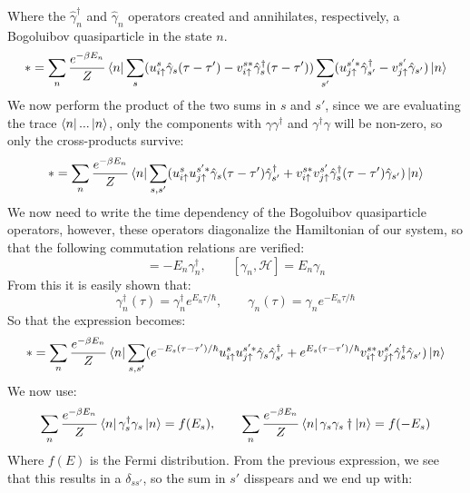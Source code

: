 \documentclass[letterpaper,12pt]{article}
\begin{document}
Where the $\hat{\gamma}^\dagger_n$ and $\hat{\gamma}_n$ operators created and annihilates, respectively, a Bogoluibov quasiparticle in the state $n$. 
\begin{equation*}
    * = \sum_n  \frac{e^{-\beta E_n}}{Z}\bra{n}\sum_s (u_{i\uparrow}^s\hat{\gamma}_s(\tau - \tau') - v_{i\uparrow}^{s*}\hat{\gamma}_s^\dagger(\tau - \tau')) \sum_{s'}(u_{j\uparrow}^{s'*}\hat{\gamma}_{s'}^\dagger - v_{j\uparrow}^{s'}\hat{\gamma}_{s'}) \ket{n}
\end{equation*}
We now perform the product of the two sums in $s$ and $s'$, since we are evaluating the trace $\bra{n} ... \ket{n}$, only the components with $\gamma\gamma^\dagger$ and $\gamma^\dagger\gamma$ will be non-zero, so only the cross-products survive:
\begin{equation*}
    * = \sum_n  \frac{e^{-\beta E_n}}{Z}\bra{n}
    \sum_{s, s'} (u_{i\uparrow}^su_{j\uparrow}^{s'*}\hat{\gamma}_s(\tau - \tau')\hat{\gamma}_{s'}^\dagger + v_{i\uparrow}^{s*}v_{j\uparrow}^{s'}\hat{\gamma}_s^\dagger(\tau - \tau')\hat{\gamma}_{s'})\ket{n}
\end{equation*}
We now need to write the time dependency of the Bogoluibov quasiparticle operators, however, these operators diagonalize the Hamiltonian of our system, so that the following commutation relations are verified:
\begin{equation}
    [\gamma_n^\dagger, \mathcal{H}] = -E_n\gamma_n^\dagger, \qquad [\gamma_n, \mathcal{H}] = E_n\gamma_n
\end{equation}
From this it is easily shown that:
\begin{equation}
    \gamma_n^\dagger(\tau) = \gamma_n^\dagger e^{E_n\tau/\hbar}, \qquad \gamma_n(\tau) = \gamma_n e^{-E_n\tau/\hbar}
\end{equation}
So that the expression becomes:
\begin{equation*}
    * = \sum_n  \frac{e^{-\beta E_n}}{Z}\bra{n}
    \sum_{s, s'} (e^{-E_s(\tau - \tau')/\hbar} u_{i\uparrow}^su_{j\uparrow}^{s'*}\hat{\gamma}_s\hat{\gamma}_{s'}^\dagger + e^{E_s(\tau - \tau')/\hbar}v_{i\uparrow}^{s*}v_{j\uparrow}^{s'}\hat{\gamma}_s^\dagger\hat{\gamma}_{s'})\ket{n}
\end{equation*}
We now use:
\begin{equation}
    \sum_n \frac{e^{-\beta E_n}}{Z} \bra{n} \gamma_s^\dagger \gamma_s \ket{n} = f(E_s), \qquad \sum_n \frac{e^{-\beta E_n}}{Z} \bra{n} \gamma_s\gamma_s\dagger \ket{n} = f(-E_s)
\end{equation}
Where $f(E)$ is the Fermi distribution. From the previous expression, we see that this results in a $\delta_{ss'}$, so the sum in $s'$ disspears and we end up with:
\end{document}
